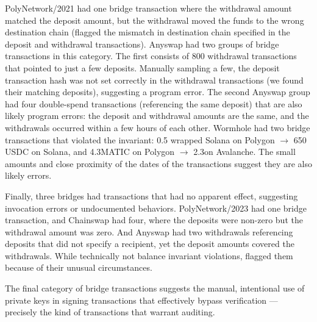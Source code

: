 PolyNetwork/2021 had one bridge transaction where the withdrawal
amount matched the deposit amount, but the withdrawal moved the funds
to the wrong destination chain (\offlinetool flagged the mismatch in
destination chain specified in the deposit and withdrawal
transactions).
%
Anyswap had two groups of bridge transactions in this category.  The
first consists of 800 withdrawal transactions that pointed to just a
few deposits. Manually sampling a few, the deposit transaction hash
was not set correctly in the withdrawal transactions (we found their
matching deposits), suggesting a program error.  The second Anyswap
group had four double-spend transactions (referencing the same
deposit) that are also likely program errors: the deposit and
withdrawal amounts are the same, and the withdrawals occurred within a
few hours of each other.
%
Wormhole had two bridge transactions that violated the invariant: 0.5
wrapped Solana on Polygon $\rightarrow$ 650 USDC on Solana, and
4.3\thou MATIC on Polygon $\rightarrow$ 2.3\thou on Avalanche.  The
small amounts and close proximity of the dates of the transactions
suggest they are also likely errors.

Finally, three bridges had transactions that had no apparent effect,
suggesting invocation errors or undocumented behaviors.
PolyNetwork/2023 had one bridge transaction, and Chainswap had four,
where the deposits were non-zero but the withdrawal amount was zero. And Anyswap had two withdrawals
referencing deposits that did not specify a recipient, yet the deposit
amounts covered the withdrawals.  While technically not balance
invariant violations, \offlinetool flagged them because of their
unusual circumstances.






%
The final category of bridge transactions suggests the manual,
intentional use of private keys in signing transactions that
effectively bypass verification --- precisely the kind of transactions
that warrant auditing.


